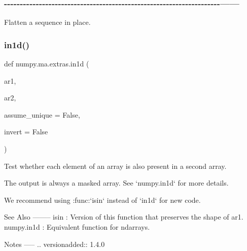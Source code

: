 \subsubsection*{-\/-\/-\/-\/-\/-\/-\/-\/-\/-\/-\/-\/-\/-\/-\/-\/-\/-\/-\/-\/-\/-\/-\/-\/-\/-\/-\/-\/-\/-\/-\/-\/-\/-\/-\/-\/-\/-\/-\/-\/-\/-\/-\/-\/-\/-\/-\/-\/-\/-\/-\/-\/-\/-\/-\/-\/-\/-\/-\/-\/-\/-\/-\/-\/-\/-\/-\/-\/------ }



 

\begin{DoxyVerb}Flatten a sequence in place.\end{DoxyVerb}
 \mbox{\label{namespacenumpy_1_1ma_1_1extras_a81b38072890e630215b0a6d6b6a8409c}} 
\subsubsection{\texorpdfstring{in1d()}{in1d()}}
{\footnotesize\ttfamily def numpy.\+ma.\+extras.\+in1d (\begin{DoxyParamCaption}\item[{}]{ar1,  }\item[{}]{ar2,  }\item[{}]{assume\+\_\+unique = {\ttfamily False},  }\item[{}]{invert = {\ttfamily False} }\end{DoxyParamCaption})}

\begin{DoxyVerb}Test whether each element of an array is also present in a second
array.

The output is always a masked array. See `numpy.in1d` for more details.

We recommend using :func:`isin` instead of `in1d` for new code.

See Also
--------
isin       : Version of this function that preserves the shape of ar1.
numpy.in1d : Equivalent function for ndarrays.

Notes
-----
.. versionadded:: 1.4.0\end{DoxyVerb}
 \mbox{\label{namespacenumpy_1_1ma_1_1extras_a75189ea3a02fefb33f9847d5540fdfd1}} 
